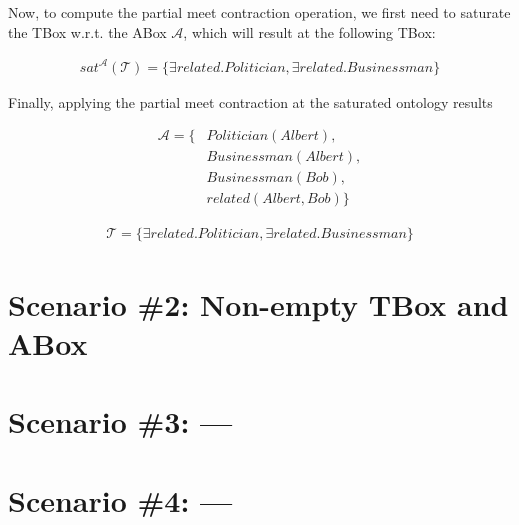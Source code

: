 Now, to compute the partial meet contraction operation, we first need to saturate the TBox w.r.t. the ABox $\mathcal{A}$, which will result at the following TBox:

\begin{equation*}
    \begin{aligned}
        sat^{\mathcal{A}}(\mathcal{T}) = \{ \exists related.Politician, \exists related.Businessman \}
    \end{aligned}
\end{equation*}

Finally, applying the partial meet contraction at the saturated ontology results

\begin{equation*}
    \begin{aligned}
        \mathcal{A} = \{ & Politician(Albert),  \\
                         & Businessman(Albert), \\
                         & Businessman(Bob),    \\
                         & related(Albert, Bob) \}
    \end{aligned}
\end{equation*}

\begin{equation*}
    \begin{aligned}
        \mathcal{T} = \{ \exists related.Politician, \exists related.Businessman \}
    \end{aligned}
\end{equation*}

\section{Scenario \#2: Non-empty TBox and ABox}
\label{sec:scenario-2}

\section{Scenario \#3: ---}
\label{sec:scenario-3}

\section{Scenario \#4: ---}
\label{sec:scenario-4}


